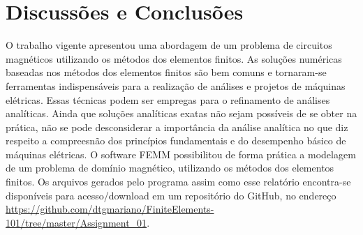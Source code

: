 
\section{Discussões e Conclusões}
O trabalho vigente apresentou uma abordagem de um problema de circuitos magnéticos utilizando os métodos dos elementos finitos. As soluções numéricas baseadas nos métodos dos elementos finitos são bem comuns e tornaram-se ferramentas indispensáveis para a realização de análises e projetos de máquinas elétricas. Essas técnicas podem ser empregas para o refinamento de análises analíticas. Ainda que soluções analíticas exatas não sejam possíveis de se obter na prática, não se pode desconsiderar a importância da análise analítica no que diz respeito a compreesnão dos princípios fundamentais e do desempenho básico de máquinas elétricas. O software FEMM possibilitou de forma prática a modelagem de um problema de domínio magnético, utilizando os métodos dos elementos finitos. Os arquivos gerados pelo programa assim como esse relatório encontra-se disponíveis para acesso/download em um repositório do GitHub, no endereço \url{https://github.com/dtgmariano/FiniteElements-101/tree/master/Assignment_01}.
